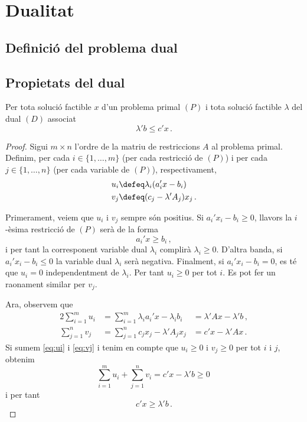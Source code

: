 \chapter{Dualitat}

\section{Definició del problema dual}

\section{Propietats del dual}
\begin{teo}\label{teo:dualitat-feble}
    Per tota solució factible $x$ d'un problema primal $\left(P\right)$ i tota solució factible $\lambda$ del dual $\left(D\right)$ associat
    \[ \lambda'b\leq c'x\,. \]
    \begin{proof}
    	Sigui $m\times n$ l'ordre de la matriu de restriccions $A$ al problema primal. Definim, per cada $i\in\{1,\ldots,m\}$ (per cada restricció de $(P)$) i per cada $j\in\{1,\ldots,n\}$ (per cada variable de $(P)$), respectivament, 
    	\begin{align*}
    		u_i &\defeq \lambda_i(a_i'x-b_i)\\
    		v_j &\defeq (c_j - \lambda'A_j)x_j\,.
    	\end{align*}
    	
    	Primerament, veiem que $u_i$ i $v_j$ sempre són positius. Si $a_i'x_i-b_i \ge 0$, llavors la $i$-èsima restricció de $(P)$ serà de la forma \[a_i'x \ge b_i\,,\] i per tant la corresponent variable dual $\lambda_i$ complirà $\lambda_i \ge 0$. D'altra banda, si $a_i'x_i-b_i \le 0$ la variable dual $\lambda_i$ serà negativa. Finalment, si $a_i'x_i-b_i = 0$, es té que $u_i = 0$ independentment de $\lambda_i$. Per tant $u_i \ge 0$ per tot $i$. Es pot fer un raonament similar per $v_j$.
    	
    	Ara, observem que
    	\begin{alignat}{2}{}
    		\sum_{i = 1}^{m} u_i &= \sum_{i = 1}^{m} \lambda_ia_i'x-\lambda_ib_i &= \lambda'Ax - \lambda'b\,, \label{eq:ui}\\
    		\sum_{j = 1}^{n} v_j &= \sum_{j = 1}^{n} c_jx_j - \lambda'A_jx_j &= c'x - \lambda'Ax\,. \label{eq:vj}
    	\end{alignat}
    	Si sumem \eqref{eq:ui} i \eqref{eq:vj} i tenim en compte que $u_i \ge 0$ i $v_j \ge 0$ per tot $i$ i $j$, obtenim
    	\begin{equation}\label{eq:sum-ui-vj}
    		\sum_{i = 1}^{m} u_i + \sum_{j = 1}^{n} v_i= c'x-\lambda'b \ge 0\,
    	\end{equation}
    	i per tant \[c'x \ge \lambda'b\,.\]
    \end{proof}
\end{teo}
